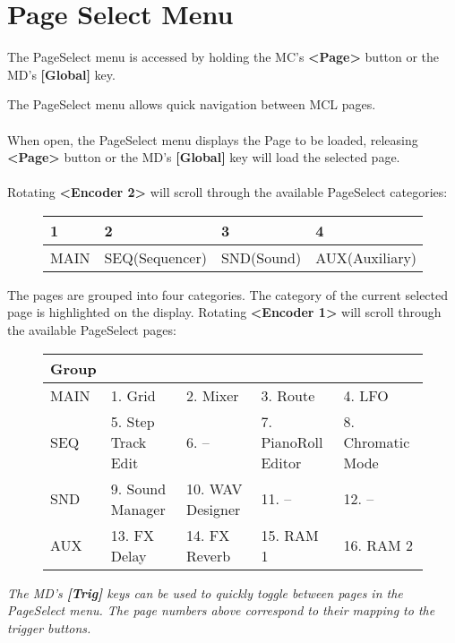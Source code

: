 \chapter{Page Select Menu}
The PageSelect menu is accessed by holding the MC's \textbf{<Page>} button or the MD's \textbf{[Global]} key.

The PageSelect menu allows quick navigation between MCL pages.
\\
\\
When open, the PageSelect menu displays the Page to be loaded, releasing \textbf{<Page>} button or the MD's \textbf{[Global]} key will load the selected page.
\\
\\
Rotating \textbf{<Encoder 2>} will scroll through the available PageSelect categories:

\begin{figure}[h]
    \begin{tabular}{|l|l|l|l|}
    \hline
    \rowcolor[HTML]{C0C0C0} 
    1    & 2              & 3          & 4              \\ \hline
    MAIN & SEQ(Sequencer) & SND(Sound) & AUX(Auxiliary) \\ \hline
    \end{tabular}
\end{figure}

The pages are grouped into four categories. The category of the current selected page is highlighted on the display.
Rotating \textbf{<Encoder 1>} will scroll through the available PageSelect pages:

\begin{figure}[h]
    \begin{tabular}{|l|l|l|l|l|}
    \hline
    \rowcolor[HTML]{C0C0C0} 
    {\color[HTML]{000000} Group} & \multicolumn{4}{l|}{\cellcolor[HTML]{C0C0C0}{\color[HTML]{000000} Pages}}      \\ \hline
    MAIN                              & 1. Grid            & 2. Mixer         & 3. Route           & 4. LFO            \\ \hline
    SEQ                               & 5. Step Track Edit & 6. -- & 7. PianoRoll Editor & 8. Chromatic Mode \\ \hline
    SND                               & 9. Sound Manager   & 10. WAV Designer & 11. --       & 12. --      \\ \hline
    AUX                               & 13. FX Delay       & 14. FX Reverb    & 15. RAM 1          & 16. RAM 2         \\ \hline
    \end{tabular}
\end{figure}

\textit{The MD's \textbf{[Trig]} keys can be used to quickly toggle between pages in the PageSelect menu. The page numbers above correspond to their mapping to the trigger buttons. }







